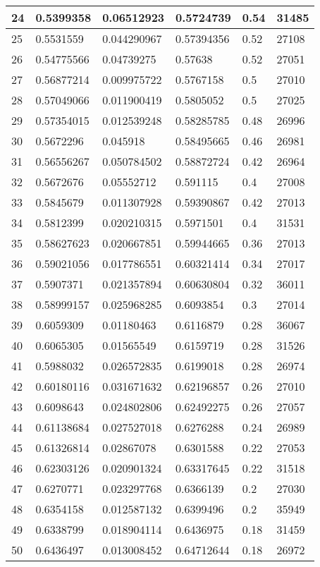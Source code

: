 \begin{longtable}{|l|l|l|l|l|l|}
24 & 0.5399358 & 0.06512923 & 0.5724739 & 0.54 & 31485 \\ \hline 
25 & 0.5531559 & 0.044290967 & 0.57394356 & 0.52 & 27108 \\ \hline 
26 & 0.54775566 & 0.04739275 & 0.57638 & 0.52 & 27051 \\ \hline 
27 & 0.56877214 & 0.009975722 & 0.5767158 & 0.5 & 27010 \\ \hline 
28 & 0.57049066 & 0.011900419 & 0.5805052 & 0.5 & 27025 \\ \hline 
29 & 0.57354015 & 0.012539248 & 0.58285785 & 0.48 & 26996 \\ \hline 
30 & 0.5672296 & 0.045918 & 0.58495665 & 0.46 & 26981 \\ \hline 
31 & 0.56556267 & 0.050784502 & 0.58872724 & 0.42 & 26964 \\ \hline 
32 & 0.5672676 & 0.05552712 & 0.591115 & 0.4 & 27008 \\ \hline 
33 & 0.5845679 & 0.011307928 & 0.59390867 & 0.42 & 27013 \\ \hline 
34 & 0.5812399 & 0.020210315 & 0.5971501 & 0.4 & 31531 \\ \hline 
35 & 0.58627623 & 0.020667851 & 0.59944665 & 0.36 & 27013 \\ \hline 
36 & 0.59021056 & 0.017786551 & 0.60321414 & 0.34 & 27017 \\ \hline 
37 & 0.5907371 & 0.021357894 & 0.60630804 & 0.32 & 36011 \\ \hline 
38 & 0.58999157 & 0.025968285 & 0.6093854 & 0.3 & 27014 \\ \hline 
39 & 0.6059309 & 0.01180463 & 0.6116879 & 0.28 & 36067 \\ \hline 
40 & 0.6065305 & 0.01565549 & 0.6159719 & 0.28 & 31526 \\ \hline 
41 & 0.5988032 & 0.026572835 & 0.6199018 & 0.28 & 26974 \\ \hline 
42 & 0.60180116 & 0.031671632 & 0.62196857 & 0.26 & 27010 \\ \hline 
43 & 0.6098643 & 0.024802806 & 0.62492275 & 0.26 & 27057 \\ \hline 
44 & 0.61138684 & 0.027527018 & 0.6276288 & 0.24 & 26989 \\ \hline 
45 & 0.61326814 & 0.02867078 & 0.6301588 & 0.22 & 27053 \\ \hline 
46 & 0.62303126 & 0.020901324 & 0.63317645 & 0.22 & 31518 \\ \hline 
47 & 0.6270771 & 0.023297768 & 0.6366139 & 0.2 & 27030 \\ \hline 
48 & 0.6354158 & 0.012587132 & 0.6399496 & 0.2 & 35949 \\ \hline 
49 & 0.6338799 & 0.018904114 & 0.6436975 & 0.18 & 31459 \\ \hline 
50 & 0.6436497 & 0.013008452 & 0.64712644 & 0.18 & 26972 \\ \hline 
\end{longtable}